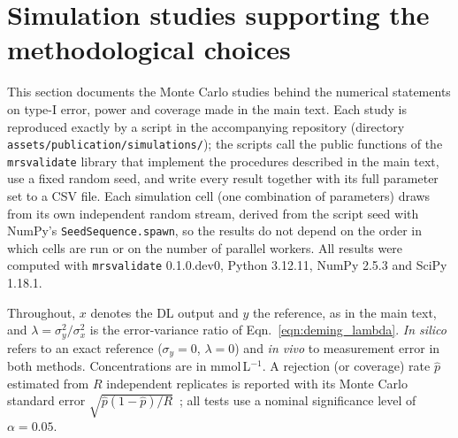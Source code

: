 %
%

\section{Simulation studies supporting the methodological choices}
\label{supp:sim}

This section documents the Monte Carlo studies behind the numerical statements on type-I error, power and coverage made in the main text. Each study is reproduced exactly by a script in the accompanying repository (directory \texttt{assets/publication/simulations/}); the scripts call the public functions of the \texttt{mrsvalidate} library that implement the procedures described in the main text, use a fixed random seed, and write every result together with its full parameter set to a CSV file. Each simulation cell (one combination of parameters) draws from its own independent random stream, derived from the script seed with NumPy's \texttt{SeedSequence.spawn}, so the results do not depend on the order in which cells are run or on the number of parallel workers.
All results were computed with \texttt{mrsvalidate} 0.1.0.dev0, Python 3.12.11, NumPy 2.5.3 and SciPy 1.18.1.

Throughout, $x$ denotes the DL output and $y$ the reference, as in the main text, and $\lambda = \sigma^2_y/\sigma^2_x$ is the error-variance ratio of Eqn.~\ref{eqn:deming_lambda}. \textit{In silico} refers to an exact reference ($\sigma_y = 0$, $\lambda = 0$) and \textit{in vivo} to measurement error in both methods. Concentrations are in mmol\,L$^{-1}$. A rejection (or coverage) rate $\hat p$ estimated from $R$ independent replicates is reported with its Monte Carlo standard error $\sqrt{\hat p(1-\hat p)/R}$~\cite{Morris2019}; all tests use a nominal significance level of $\alpha = 0.05$.

